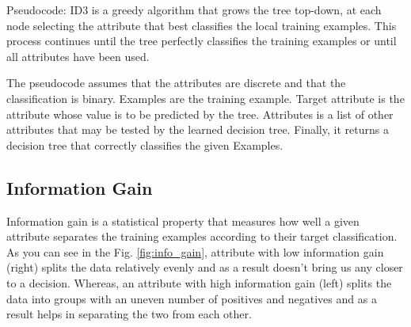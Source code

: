 Pseudocode: ID3 is a greedy algorithm that grows the tree top-down, at each node selecting the attribute that best classifies the local training examples. This process continues until the tree perfectly classifies the training examples or until all attributes have been used.

The pseudocode assumes that the attributes are discrete and that the classification is binary. Examples are the training example. Target attribute is the attribute whose value is to be predicted by the tree. Attributes is a list of other attributes that may be tested by the learned decision tree. Finally, it returns a decision tree that correctly classifies the given Examples.

\subsection{Information Gain}
Information gain is a statistical property that measures how well a given attribute separates the training examples according to their target classification. As you can see in the Fig. \ref{fig:info_gain}, attribute with low information gain (right) splits the data relatively evenly and as a result doesn't bring us any closer to a decision. Whereas, an attribute with high information gain (left) splits the data into groups with an uneven number of positives and negatives and as a result helps in separating the two from each other.

